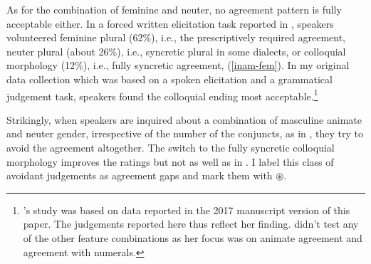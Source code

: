 \documentclass[output=paper,
modfonts
newtxmath,
hidelinks
]{langscibook}
\begin{document}
\z

\z

As for the combination of feminine and neuter, no agreement pattern is fully acceptable either. In a forced written elicitation task reported in \citet{Adam:2017}, speakers volunteered feminine plural (62\%), i.e., the prescriptively required agreement, neuter plural (about 26\%), i.e., syncretic plural in some dialects, or colloquial morphology (12\%), i.e., fully syncretic agreement, (\ref{inam-fem}). In my original data collection which was based on a spoken elicitation and a grammatical judgement task, speakers found the colloquial ending most acceptable.\footnote{\citeauthor{Adam:2017}'s study was based on data reported in the 2017 manuscript version of this paper. The judgements reported here thus reflect her finding. \citeauthor{Adam:2017} didn't test any of the other feature combinations as her focus was on animate agreement and agreement with numerals.}

\z




\noindent Strikingly, when speakers are inquired about a combination of masculine animate and neuter gender, irrespective of the number of the conjuncts, as in , they try to avoid the agreement altogether. The switch to the fully syncretic colloquial morphology improves the ratings but not as well as in . I label this class of avoidant judgements as agreement gaps and mark them with $\circledast$.
\end{document}
